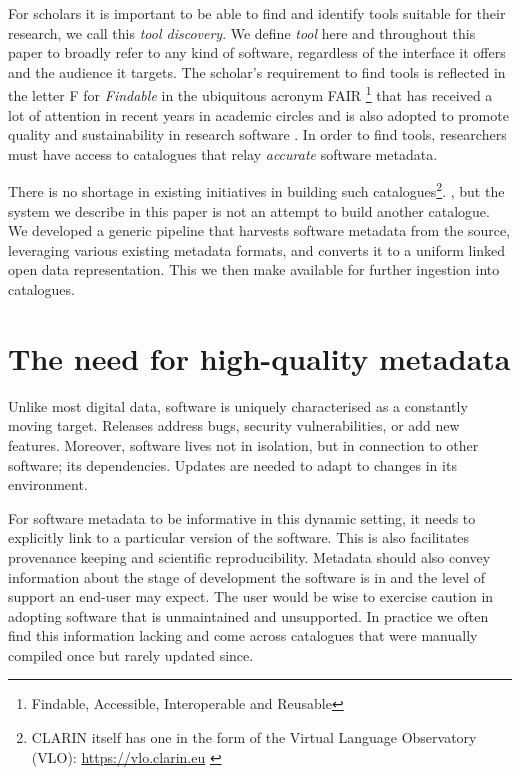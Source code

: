 \documentclass[a4paper,11pt]{article}
\begin{document}
For scholars it is important to be able to find and identify tools
suitable for their research, we call this \emph{tool discovery}. We define
\emph{tool} here and throughout this paper to broadly refer to any kind of
software, regardless of the interface it offers and the audience it targets.
The scholar's requirement to find tools is reflected in the letter \textsc{F}
for \emph{Findable} in the ubiquitous acronym \textsc{FAIR} \footnote{Findable,
Accessible, Interoperable and Reusable} that has received a lot of attention in
recent years in academic circles and is also adopted to promote quality and
sustainability in research software \citep{FAIR}. In order to find tools,
researchers must have access to catalogues that relay \emph{accurate} software
metadata.

There is no shortage in existing initiatives in building such catalogues\footnote{CLARIN itself has one in the form of the Virtual Language Observatory (VLO): \url{https://vlo.clarin.eu} \citep{VLO}}.
, %
but the system we describe in this paper is not an attempt to build another catalogue.
We developed a generic pipeline that harvests software metadata from the source, leveraging
various existing metadata formats, and converts it to a uniform linked open data representation.
This we then make available for further ingestion into catalogues. 



\section{The need for high-quality metadata}

Unlike most digital data, software is uniquely characterised as a constantly
moving target. Releases address bugs, security vulnerabilities, or add new
features. Moreover, software lives not in isolation, but in connection to other
software; its dependencies. Updates are needed to adapt to changes in its
environment.

For software metadata to be informative in this dynamic setting, it needs to
explicitly link to a particular version of the software. This is also
facilitates provenance keeping and scientific reproducibility. Metadata should
also convey information about the stage of development the software is in and
the level of support an end-user may expect. The user would be wise to exercise
caution in adopting software that is unmaintained and unsupported. In practice
we often find this information lacking and come across catalogues that were
manually compiled once but rarely updated since.
\end{document}
